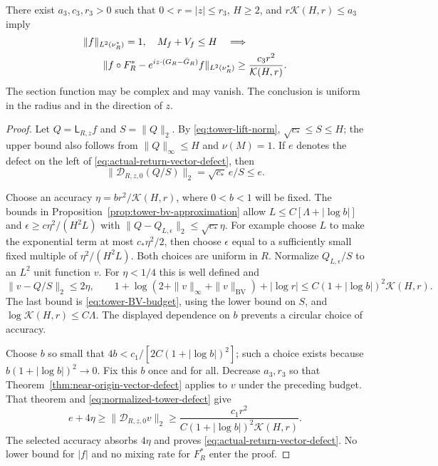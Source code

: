 \begin{theorem}
\label{thm:actual-return-vector-defect}
There exist $a_3,c_3,r_3>0$ such that
$0<r=|z|\le r_3$, $H\ge2$, and $r\mathcal K(H,r)\le a_3$ imply
\begin{align}
 &\|f\|_{L^2(\nu_R^*)}=1,\quad M_f+V_f\le H
 \quad\Longrightarrow\notag\\
 &\qquad
 \|f\circ F_R^*-e^{iz\cdot(G_R-\bar G_R)}f\|_{L^2(\nu_R^*)}
                     \ge\frac{c_3r^2}{\mathcal K(H,r)}.
                         \label{eq:actual-return-vector-defect}
\end{align}
The section function may be complex and may vanish. The conclusion
is uniform in the radius and in the direction of $z$.
\end{theorem}
\begin{proof}
Let $Q=\mathsf L_{R,z}f$ and $S=\|Q\|_2$. By
\eqref{eq:tower-lift-norm}, $\sqrt{c_*}\le S\le H$; the upper bound
also follows from $\|Q\|_\infty\le H$ and $\nu(M)=1$.
If $e$ denotes the defect on the left of
\eqref{eq:actual-return-vector-defect}, then
\begin{equation}\label{eq:normalized-tower-defect}
 \|\mathcal D_{R,z,0}(Q/S)\|_2=\sqrt{c_*}\,e/S\le e.
\end{equation}

Choose an accuracy
$\eta=b r^2/\mathcal K(H,r)$, where $0<b<1$ will be fixed.
The bounds in Proposition~\ref{prop:tower-bv-approximation} allow
$L\le C[\Lambda+|\log b|]$ and
$\epsilon\ge c\eta^2/(H^2L)$ with
$\|Q-Q_{L,\epsilon}\|_2\le\sqrt{c_*}\eta$.
For example choose $L$ to make the exponential term at most
$c_*\eta^2/2$, then choose $\epsilon$ equal to a sufficiently small
fixed multiple of $\eta^2/(H^2L)$. Both choices are uniform in $R$.
Normalize $Q_{L,\epsilon}/S$ to an $L^2$ unit function $v$.
For $\eta<1/4$ this is well defined and
\[
 \|v-Q/S\|_2\le2\eta,\qquad
 1+\log(2+\|v\|_\infty+\|v\|_{\mathrm{BV}})+|\log r|
       \le C(1+|\log b|)^2\mathcal K(H,r).
\]
The last bound is \eqref{eq:tower-BV-budget}, using the lower bound
on $S$, and $\log\mathcal K(H,r)\le C\Lambda$.
The displayed dependence on $b$ prevents a circular choice of accuracy.

Choose $b$ so small that
$4b<c_1/[2C(1+|\log b|)^2]$; such a choice exists because
$b(1+|\log b|)^2\to0$. Fix this $b$ once and for all. Decrease
$a_3,r_3$ so that Theorem~\ref{thm:near-origin-vector-defect} applies
to $v$ under the preceding budget. That theorem and
\eqref{eq:normalized-tower-defect} give
\[
 e+4\eta\ge\|\mathcal D_{R,z,0}v\|_2
   \ge\frac{c_1r^2}{C(1+|\log b|)^2\mathcal K(H,r)}.
\]
The selected accuracy absorbs $4\eta$ and proves
\eqref{eq:actual-return-vector-defect}. No lower bound for $|f|$
and no mixing rate for $F_R^*$ enter the proof.
\end{proof}

